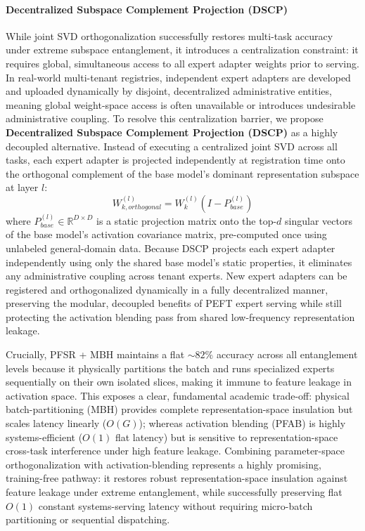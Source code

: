   \paragraph{Decentralized Subspace Complement Projection (DSCP)}
  While joint SVD orthogonalization successfully restores multi-task accuracy under extreme subspace entanglement, it introduces a centralization constraint: it requires global, simultaneous access to all expert adapter weights prior to serving. In real-world multi-tenant registries, independent expert adapters are developed and uploaded dynamically by disjoint, decentralized administrative entities, meaning global weight-space access is often unavailable or introduces undesirable administrative coupling. To resolve this centralization barrier, we propose \textbf{Decentralized Subspace Complement Projection (DSCP)} as a highly decoupled alternative. Instead of executing a centralized joint SVD across all tasks, each expert adapter is projected independently at registration time onto the orthogonal complement of the base model's dominant representation subspace at layer $l$:
  \begin{equation}
    W_{k, orthogonal}^{(l)} = W_k^{(l)} \left( I - P_{base}^{(l)} \right)
  \end{equation}
  where $P_{base}^{(l)} \in \mathbb{R}^{D \times D}$ is a static projection matrix onto the top-$d$ singular vectors of the base model's activation covariance matrix, pre-computed once using unlabeled general-domain data. Because DSCP projects each expert adapter independently using only the shared base model's static properties, it eliminates any administrative coupling across tenant experts. New expert adapters can be registered and orthogonalized dynamically in a fully decentralized manner, preserving the modular, decoupled benefits of PEFT expert serving while still protecting the activation blending pass from shared low-frequency representation leakage. 

  Crucially, \textsc{PFSR} + \textsc{MBH} maintains a flat $\sim 82\%$ accuracy across all entanglement levels because it physically partitions the batch and runs specialized experts sequentially on their own isolated slices, making it immune to feature leakage in activation space. This exposes a clear, fundamental academic trade-off: physical batch-partitioning (MBH) provides complete representation-space insulation but scales latency linearly ($O(G)$); whereas activation blending (PFAB) is highly systems-efficient ($O(1)$ flat latency) but is sensitive to representation-space cross-task interference under high feature leakage. Combining parameter-space orthogonalization with activation-blending represents a highly promising, training-free pathway: it restores robust representation-space insulation against feature leakage under extreme entanglement, while successfully preserving flat $O(1)$ constant systems-serving latency without requiring micro-batch partitioning or sequential dispatching.

